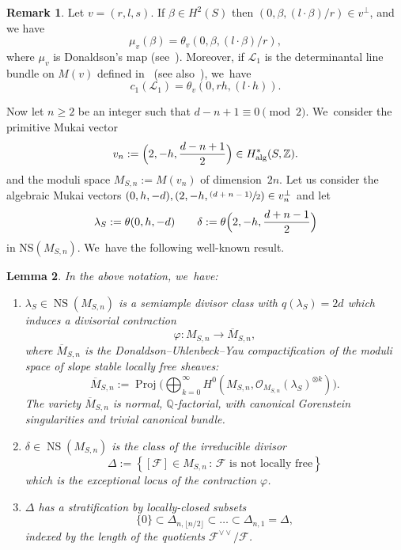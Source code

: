 \documentclass[11pt]{article}
\newenvironment{enumeratea}
{\bgroup\def\theenumi{\alph{enumi}}\begin{enumerate}}
{\end{enumerate}\egroup}
\newcommand{\psfrac}[2]{\sfrac{(#1)}{#2}}
\let\oldbot\bot
\renewcommand{\bot}{{\scriptscriptstyle\oldbot}}
\newcommand{\QQ}{{\mathbb Q}}\let\Q\QQ
\newcommand{\ZZ}{{\mathbb Z}}\let\Z\ZZ
\newcommand\cF{\mathcal{F}}
\newcommand\cL{\mathcal{L}}
\newcommand\cO{\mathcal{O}}
\DeclareMathOperator{\NS}{NS}
\DeclareMathOperator{\Proj}{Proj}
\let\phi\varphi
\newtheorem{lemm}{Lemma}[section]
\theoremstyle{definition}
\newtheorem{rema}[lemm]{Remark}
\begin{document}
\begin{rema}\label{rema:dondivisors}
Let $v=(r,l,s)$.
If $\beta\in H^2(S)$ then
$(0,\beta,(l\cdot \beta)/r)\in v^{\bot}$, and we have
\begin{equation*}
\mu_v(\beta)=\theta_v(0,\beta,(l\cdot \beta)/r),
\end{equation*}
where $\mu_v$ is Donaldson's map (see~\cite[\S 3]{Kieran:weight2}). Moreover, if $\cL_1$ is the determinantal line bundle on $M(v)$ defined in~\cite{LePotier:DetLineBundle} (see also~\cite[\S 8.1]{HL:moduli}), we~have
\begin{equation*}
c_1(\cL_1)=\theta_v(0,rh,(l\cdot h)).
\end{equation*}
\end{rema}

Now let $n\geq2$ be an integer such that $d-n+1\equiv 0 \pmod 2$. We~consider the primitive Mukai vector
\begin{equation*}
v_n:=\Bigl(2,-h,\frac{d-n+1}{2}\Bigr)\in H^{*}_\mathrm{alg}(S,\ZZ).
\end{equation*}
and the moduli space $M_{S,n}:=M(v_n)$ of dimension~$2n$.
Let us consider the algebraic Mukai vectors $(0,h,-d),(2,-h,\psfrac{d+n-1}{2})\in v_n^\perp$ and let
\begin{equation}\label{lamdel}
\lambda_S := \theta(0,h,-d) \qquad
\delta:=\theta\Bigl(2,-h,\frac{d+n-1}{2}\Bigr)
\end{equation}
in $\mathrm{NS}(M_{S,n})$. We~have the following well-known result.

\begin{lemm}\label{lem:DUYdivisor}
In the above notation, we~have:
\begin{enumeratea}
\item\label{enum:DUYdivisor1} $\lambda_S\in\NS(M_{S,n})$ is a semiample divisor class with $q(\lambda_S)=2d$ which induces a divisorial contraction
\[
\phi\colon M_{S,n} \to \overline{M}_{S,n},
\]
where $\overline{M}_{S,n}$ is the Donaldson--Uhlenbeck--Yau compactification of the moduli space of slope stable locally free sheaves:
\[
\overline{M}_{S,n}:=\Proj\biggl(\bigoplus_{k=0}^{\infty} H^0(M_{S,n},\cO_{M_{S,n}}(\lambda_S)^{\otimes k})\biggr).
\]
The variety $\overline{M}_{S,n}$ is normal, $\QQ$-factorial, with canonical Gorenstein singularities and trivial canonical bundle.
\item\label{enum:DUYdivisor2} $\delta\in\NS(M_{S,n})$ is the class of the irreducible divisor
\[
\Delta:=\left\{[\cF]\in M_{S,n} \,:\, \text{$\cF$ is not locally free}\right\}
\]
which is the exceptional locus of the contraction $\phi$.
\item\label{enum:DUYdivisor3} $\Delta$ has a stratification by locally-closed subsets
\[
\{ 0 \} \subset \Delta_{n,\lfloor n/2\rfloor} \subset \ldots \subset \Delta_{n,1} = \Delta,
\]
indexed by the length of the quotients $\cF^{\vee\vee}/\cF$.
\end{enumeratea}
\end{lemm}
\end{document}

